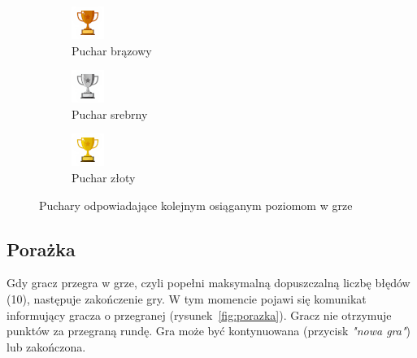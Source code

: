 \documentclass[]{report}
\begin{document}
\begin{figure}[H]
	\centering
	\begin{subfigure}{0.3\textwidth}
		\centering
		\includegraphics[width=0.25\linewidth]{puchar_1}
		\caption{Puchar brązowy}
		\label{fig:puchar_brazawy}
	\end{subfigure}
	\begin{subfigure}{0.3\textwidth}
		\centering
		\includegraphics[width=0.25\linewidth]{puchar_2}
		\caption{Puchar srebrny}
		\label{fig:puchar_srebrny}
	\end{subfigure}
	\begin{subfigure}{0.3\textwidth}
		\centering
		\includegraphics[width=0.25\linewidth]{puchar_3}
		\caption{Puchar złoty}
		\label{fig:puchar_zloty}
	\end{subfigure}
	\caption{Puchary odpowiadające kolejnym osiąganym poziomom w grze}
	\label{fig:puchary}
\end{figure}

\FloatBarrier
\subsection*{Porażka}
\FloatBarrier
Gdy gracz przegra w grze, czyli popełni maksymalną dopuszczalną liczbę błędów (10), następuje zakończenie gry. W tym momencie pojawi się komunikat informujący gracza o przegranej (rysunek~\ref{fig:porazka}). Gracz nie otrzymuje punktów za przegraną rundę. Gra może być kontynuowana (przycisk \textit{"nowa gra"}) lub zakończona.
\end{document}
